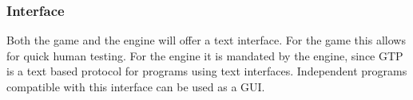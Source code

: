 \subsubsection{Interface}

Both the game and the engine will offer a text interface. For the game this
allows for quick human testing. For the engine it is mandated by the engine,
since GTP is a text based protocol for programs using text interfaces.
Independent programs compatible with this interface can be used as a GUI.
